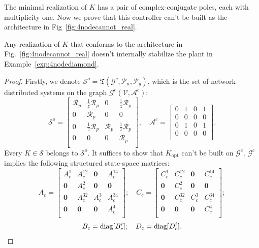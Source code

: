 The minimal realization of \(K\) has a pair of complex-conjugate poles, each with multiplicity one. Now we prove that this controller can't be built as the architecture in Fig~\ref{fig:4nodecannot_real}. 
\begin{prop}
    Any realization of \(K\) that conforms to the architecture in Fig.~\ref{fig:4nodecannot_real} doesn't internally stabilize the plant in Example~\ref{exp:4nodediamond}.
\end{prop}
\begin{proof}
Firstly, we denote \(\mathcal{S}^{o} = \mathfrak{T}(\mathcal{G}^c,\mathcal{P}_{u},\mathcal{P}_y)\), which is the set of network distributed systems on the graph \(\mathcal{G}^c(\mathcal{V},\mathcal{A}^c)\):
\[
\mathcal{S}^{o} = 
\begin{bmatrix}
\mathcal{R}_p & \frac{1}{z}\mathcal{R}_p & 0 & \frac{1}{z}\mathcal{R}_p\\
0 & \mathcal{R}_p & 0 & 0\\
0 & \frac{1}{z}\mathcal{R}_p & \mathcal{R}_p & \frac{1}{z}\mathcal{R}_p\\
0 & 0 & 0 & \mathcal{R}_p\\
\end{bmatrix},\quad 
\mathcal{A}^{c} = 
\begin{bmatrix}
0 & 1 & 0 & 1\\
0 & 0 & 0 & 0\\
0 & 1 & 0 & 1\\
0 & 0 & 0 & 0\\
\end{bmatrix}.
\]
Every \(K \in \mathcal{S}\) belongs to \(\mathcal{S}^{o}\). It suffices to show that \(K_\mathrm{opt}\) can't be built on \(\mathcal{G}^c\). 
\(\mathcal{G}^c\) implies the following structured state-space matrices:
\begin{equation*}
    A_c =\begin{bmatrix}
        A_c^{1} & A_c^{12} & \mathbf{0} & A_c^{14} \\
        \mathbf{0} & A_c^{2}& \mathbf{0} & \mathbf{0}\\
        \mathbf{0} & A_c^{32} & A_c^{3} & A_c^{34} \\
        \mathbf{0} & \mathbf{0} & \mathbf{0} & A_c^{4}\\
    \end{bmatrix};\quad
    C_c=\begin{bmatrix}
        C_c^{1} & C_c^{12} & \mathbf{0} & C_c^{14} \\
        \mathbf{0} & C_c^{2}& \mathbf{0} & \mathbf{0}\\
        \mathbf{0} & C_c^{32} & C_c^{3} & C_c^{34} \\
        \mathbf{0} & \mathbf{0} & \mathbf{0} & C_c^{4}\\
    \end{bmatrix};
\end{equation*}
\begin{equation}\label{eqn::4nodereal}
    B_c = {\mathrm{diag}}[B_{c}^i]; \quad D_{c} = {\mathrm{diag}}[D_{c}^i].
\end{equation}


\end{proof}
